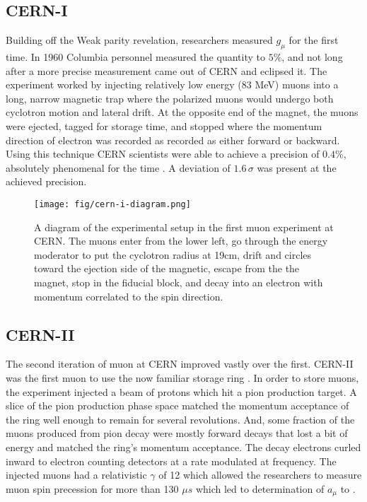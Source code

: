 \subsection{CERN-I}
Building off the Weak parity revelation, researchers measured $g_\mu$ for the first time.  In 1960 Columbia personnel measured the quantity to $5\%$, and not long after a more precise measurement came out of CERN and eclipsed it.  The experiment worked by injecting relatively low energy (83 MeV) muons into a long, narrow magnetic trap where the polarized muons would undergo both cyclotron motion and lateral drift. At the opposite end of the magnet, the muons were ejected, tagged for storage time, and stopped where the momentum direction of electron was recorded as recorded as either forward or backward.  Using this technique CERN scientists were able to achieve a precision of $0.4\%$, absolutely phenomenal for the time \cite{cern-i}.  A deviation of $1.6\,\sigma$ was present at the achieved precision.

\begin{figure}
\centering
\texttt{[image: fig/cern-i-diagram.png]}
\label{fig:cern-i-diagram}
\caption{A diagram of the experimental setup in the first muon \gmtwo experiment at CERN. The muons enter from the lower left, go through the energy moderator to put the cyclotron radius at 19cm, drift and circles toward the ejection side of the magnetic, escape from the the magnet, stop in the fiducial block, and decay into an electron with momentum correlated to the spin direction.}
\end{figure}

\subsection{CERN-II}
The second iteration of muon \gmtwo at CERN improved vastly over the first.  CERN-II was the first muon \gmtwo to use the now familiar storage ring \cite{47y-muon-g-2}.  In order to store muons, the experiment injected a beam of protons which hit a pion production target.  A slice of the pion production phase space matched the momentum acceptance of the ring well enough to remain for several revolutions. And, some fraction of the muons produced from pion decay were mostly forward decays that lost a bit of energy and matched the ring's momentum acceptance.  The decay electrons curled inward to electron counting detectors at a rate modulated at \gmtwo frequency.  The injected muons had a relativistic $\gamma$ of 12 which allowed the researchers to measure muon spin precession for more than 130 $\mu s$ which led to determination of $a_\mu$ to .

